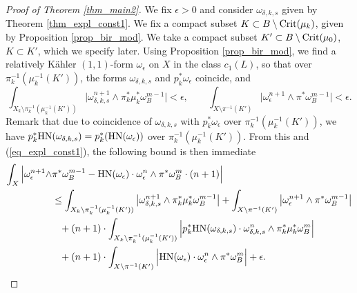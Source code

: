 \documentclass[12pt]{article}
\numberwithin{equation}{section}
\theoremstyle{theorem}
\theoremstyle{definition}
\theoremstyle{remark}
\begin{document}
	
	\begin{proof}[Proof of Theorem \ref{thm_main2}]
		We fix $\epsilon > 0$ and consider $\omega_{\delta, k, s}$ given by Theorem \ref{thm_expl_const1}.
		We fix a compact subset $K \subset B \setminus {\rm{Crit}}(\mu_k)$, given by Proposition \ref{prop_bir_mod}.
		We take a compact subset $K' \subset B \setminus {\rm{Crit}}(\mu_0)$, $K \subset K'$, which we specify later.
		Using Proposition \ref{prop_bir_mod}, we find a relatively Kähler $(1, 1)$-form $\omega_{\epsilon}$ on $X$ in the class $c_1(L)$, so that over $\pi_k^{-1} (\mu_k^{-1}(K'))$, the forms $\omega_{\delta, k, s}$ and $p_k^* \omega_{\epsilon}$ coincide, and
		\begin{equation}\label{eq_eps_away_from_soln}
			\int_{X_k \setminus \pi_k^{-1} (\mu_k^{-1}(K'))} \big| \omega_{\delta, k, s}^{n + 1} \wedge \pi_k^* \mu_k^* \omega_B^{m - 1} \big| < \epsilon, 
			\qquad 
			\int_{X \setminus \pi^{-1} (K')} \big| \omega_{\epsilon}^{n + 1} \wedge \pi^* \omega_B^{m - 1} \big| < \epsilon.
		\end{equation}
		Remark that due to coincidence of $\omega_{\delta, k, s}$ with $p_k^* \omega_{\epsilon}$ over $\pi_k^{-1} (\mu_k^{-1}(K'))$, we have $p_k^* {\rm{HN}}(\omega_{\delta, k, s}) = p_k^*( {\rm{HN}}(\omega_{\epsilon}))$ over $\pi_k^{-1} (\mu_k^{-1}(K'))$.
		From this and (\ref{eq_expl_const1}), the following bound is then immediate 
		\begin{equation}\label{eq_eps_away_from_soln2}
		\begin{aligned}
			\int_{X}
			\Big|
			\omega_{\epsilon}^{n + 1} \wedge & \pi^* \omega_B^{m - 1}
			-
			{\rm{HN}}(\omega_{\epsilon}) \cdot \omega_{\epsilon}^n \wedge  \pi^* \omega_B^m \cdot (n + 1)
			\Big|
			\\
			&
			\leq
			\int_{X_k \setminus \pi_k^{-1} (\mu_k^{-1}(K'))} \big| \omega_{\delta, k, s}^{n + 1} \wedge \pi_k^* \mu_k^* \omega_B^{m - 1} \big|
			+
			\int_{X \setminus \pi^{-1} (K')} \big| \omega_{\epsilon}^{n + 1} \wedge \pi^* \omega_B^{m - 1} \big|
			\\
			&
			{\phantom{\leq}}
			+
			(n + 1)
			\cdot
			\int_{X_k \setminus \pi_k^{-1} (\mu_k^{-1}(K'))}
			\Big|
			p_k^* {\rm{HN}}(\omega_{\delta, k, s}) \cdot \omega_{\delta, k, s}^n \wedge  \pi_k^* \mu_k^* \omega_B^m
			\Big|
			\\
			&
			{\phantom{\leq}}
			+
			(n + 1)
			\cdot
			\int_{X \setminus \pi^{-1} (K')}
			\Big|
			{\rm{HN}}(\omega_{\epsilon}) \cdot \omega_{\epsilon}^n \wedge  \pi^* \omega_B^m
			\Big| + \epsilon.
		\end{aligned}

\end{equation}
\end{proof}
\end{document}
